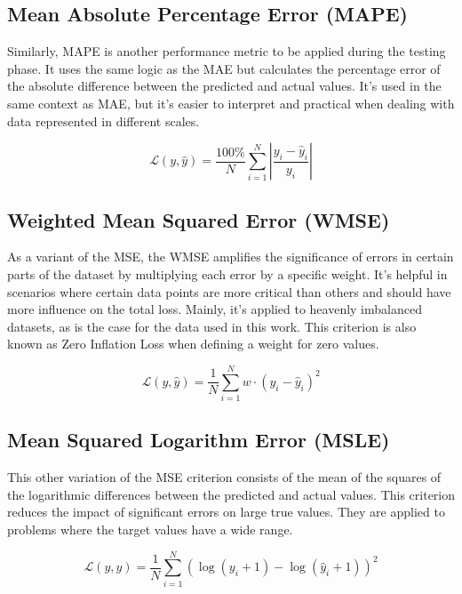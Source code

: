 \subsection{Mean Absolute Percentage Error (MAPE)}

Similarly, \gls{MAPE} is another performance metric to be applied during the testing phase. It uses the same logic as the \gls{MAE} but calculates the percentage error of the absolute difference between the predicted and actual values. It's used in the same context as MAE, but it's easier to interpret and practical when dealing with data represented in different scales.

\begin{equation}
\mathcal{L}(y, \hat{y}) = \frac{100\%}{N} \sum_{i=1}^{N} \left| \frac{y_i - \hat{y}_i}{y_i} \right|
\end{equation}

\subsection{Weighted Mean Squared Error (WMSE)}

As a variant of the MSE, the \gls{WMSE} amplifies the significance of errors in certain parts of the dataset by multiplying each error by a specific weight. It's helpful in scenarios where certain data points are more critical than others and should have more influence on the total loss. Mainly, it's applied to heavenly imbalanced datasets, as is the case for the data used in this work. This criterion is also known as Zero Inflation Loss when defining a weight for zero values.

\begin{equation}
\mathcal{L}(y, \hat{y}) = \frac{1}{N} \sum_{i=1}^{N} w \cdot (y_i - \hat{y}_i)^2
\end{equation}


\subsection{Mean Squared Logarithm Error (MSLE)}

This other variation of the MSE criterion consists of the mean of the squares of the logarithmic differences between the predicted and actual values. This criterion reduces the impact of significant errors on large true values. They are applied to problems where the target values have a wide range.

\begin{equation}
\mathcal{L}(y, \hat{y}) = \frac{1}{N} \sum_{i=1}^{N} (\log(y_i + 1) - \log(\hat{y}_i + 1))^2
\end{equation}

